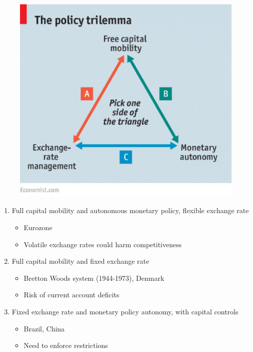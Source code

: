 \documentclass{beamer}
\begin{document}
\begin{frame}
  \begin{figure}
    \includegraphics[scale=.4]{impossible_trinity.eps}
  \end{figure}
\end{frame}



\begin{frame}
  \begin{enumerate}
    \item Full capital mobility and autonomous monetary policy, flexible exchange rate
    \begin{itemize}
      \item Eurozone
      \item Volatile exchange rates could harm competitiveness
    \end{itemize}
    \medskip
    \item Full capital mobility and fixed exchange rate
    \begin{itemize}
      \item Bretton Woods system (1944-1973), Denmark
      \item Risk of current account deficits
    \end{itemize}
    \medskip
    \item Fixed exchange rate and monetary policy autonomy, with capital controls
    \begin{itemize}
      \item Brazil, China
      \item Need to enforce restrictions
    \end{itemize}
  \end{enumerate}
\end{frame}
\end{document}
